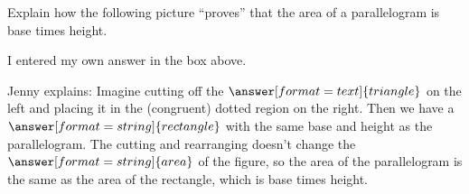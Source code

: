 \documentclass[nooutcomes]{ximera}
\begin{document}
\begin{problem}
Explain how the following picture ``proves'' that the area of a
  parallelogram is base times height.
\begin{image}
\end{image}
\begin{freeResponse}
\end{freeResponse}

I  entered my own answer in the box above.  

\begin{problem}
Jenny explains: Imagine cutting off the $\answer[format=text]{triangle}$ on the left and placing it in the (congruent) dotted region on the right.  Then we have a $\answer[format=string]{rectangle}$ with the same base and height as the parallelogram.  The cutting and rearranging doesn't change the $\answer[format=string]{area}$ of the figure, so the area of the parallelogram is the same as the area of the rectangle, which is base times height. 
\end{problem}
\end{problem}
\end{document}
